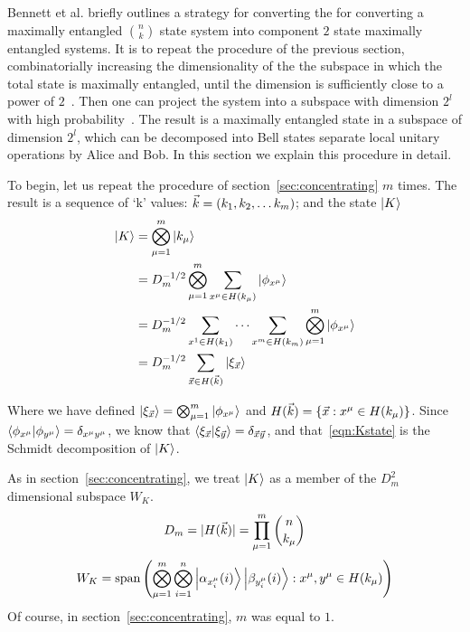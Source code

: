 Bennett et al. briefly outlines a strategy for converting the for converting a maximally entangled $\binom{n}{k}$ state system into component $2$ state maximally entangled systems. It is to repeat the procedure of the previous section, combinatorially increasing the dimensionality of the the subspace in which the total state is maximally entangled, until the dimension is sufficiently close to a power of $2$~\cite{bennett1996concentrating}.
Then one can project the system into a subspace with dimension $2^l$ with high probability~\cite{bennett1996concentrating}.
The result is a maximally entangled state in a subspace of dimension $2^l$, which can be decomposed into Bell states separate local unitary operations by Alice and Bob.
In this section we explain this procedure in detail.

To begin, let us repeat the procedure of section~\ref{sec:concentrating} $m$ times. The result is a sequence of `k' values: ${\vec{k}} = \left( k_1, k_2,\ldots k_m \right)$; and the state
$\ket{K}$
\begin{align}
\ket{K} &= \bigotimes_{\mu=1}^m \ket{k_\mu} \nonumber \\
&= D_m^{-1/2} \bigotimes_{\mu=1}^m \sum_{x^\mu \in H(k_\mu)} \ket{\phi_{x^\mu}} \nonumber \\
&=  D_m^{-1/2} \sum_{x^1 \in H(k_1)} \cdots \sum_{x^m \in H(k_m)} \bigotimes_{\mu=1}^m  \ket{\phi_{x^\mu}} \nonumber \\
\label{eqn:Kstate}
&=  D_m^{-1/2} \sum_{{\vec{x}} \in H({\vec{k}})} \ket{ \xi_{\vec{x}} }
\end{align}

Where we have defined $\ket{ \xi_{\vec{x}} } = \bigotimes_{\mu=1}^m  \ket{\phi_{x^\mu}}$ and $H({\vec{k}}) = \{{\vec{x}}: x^\mu \in H(k_\mu)\}$.
Since $\braket{\phi_{x^\mu}}{\phi_{y^\mu}} = \delta_{x^\mu y^\mu}$, we know that $\braket{\xi_{\vec{x}}}{\xi_{\vec{y}}} = \delta_{{\vec{x}} {\vec{y}}}$, and that~\eqref{eqn:Kstate} is the Schmidt decomposition of $\ket{K}$.

As in section~\ref{sec:concentrating}, we treat $\ket{K}$ as a member of the $D_m^2$ dimensional subspace $W_K$.
\begin{equation*}
D_m = |H({\vec{k}})| = \prod_{\mu=1}^{m} \binom{n}{k_\mu}
\end{equation*}
\begin{equation*}
W_K = \text{span}\left(\bigotimes_{\mu=1}^m\bigotimes_{i=1}^n 
\ket{\alpha_{x_i^\mu}(i)} \ket{\beta_{y_i^\mu}(i)}: x^\mu,y^\mu \in H(k_\mu)\right)
\end{equation*}
Of course, in section~\ref{sec:concentrating}, $m$ was equal to $1$.

